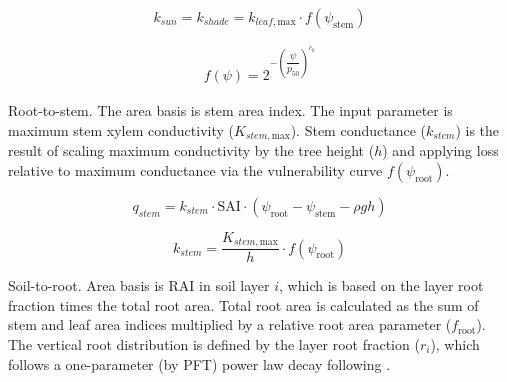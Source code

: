 \documentclass[draft,linenumbers]{agujournal}
\begin{document}
\begin{linenomath*} \begin{equation}
k_{sun} = k_{shade} = k_{leaf,\text{max}} \cdot f\left(\psi_{\text{stem}}\right)
\end{equation} \end{linenomath*}

\begin{linenomath*} \begin{equation} \begin{aligned}
f\left(\psi\right)=2^{-\left(\dfrac{\psi}{p_{50}}\right)^{c_k}}
\end{aligned} \end{equation} \end{linenomath*}

Root-to-stem. The area basis is stem area index. 
The input parameter is maximum stem xylem conductivity ($K_{stem,\text{max}}$).
Stem conductance ($k_{stem}$) is the result of scaling maximum conductivity by the tree height ($h$)
and applying loss relative to maximum conductance via the vulnerability curve $f\left(\psi_{\text{root}}\right)$. 
\begin{linenomath*} \begin{equation}
q_{stem} = k_{stem} \cdot  \text{SAI}  \cdot \left( \psi_{\text{root}}-\psi_{\text{stem}}-\rho g h\right)
\end{equation} \end{linenomath*}
\begin{linenomath*} \begin{equation}
k_{stem} = \dfrac{K_{stem,\text{max}}}{h} \cdot f\left(\psi_{\text{root}}\right)
\end{equation} \end{linenomath*}

Soil-to-root. Area basis is RAI in soil layer $i$, which is based on the layer root fraction times the
total root area. Total root area is calculated as the sum of stem and leaf area indices multiplied by a relative
root area parameter ($f_{\text{root}}$).
The vertical root distribution is defined by the layer root fraction ($r_i$), which follows a one-parameter 
(by PFT) power law decay following \citet{jackson1996}.
\end{document}
